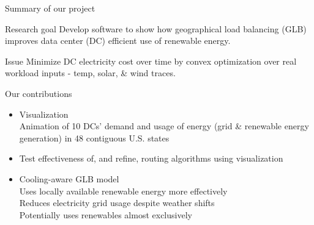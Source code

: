 \documentclass[xcolor=dvipsnames]{beamer}
\begin{document}
\begin{frame}{Summary of our project}

	\begin{block}{Research goal}  
	Develop software to show how geographical load balancing (GLB) improves data center (DC) efficient use of renewable energy.  
	\end{block}
	
	\begin{block}{Issue} 
	Minimize DC electricity cost over time by convex optimization over real workload inputs - temp, solar, \& wind traces.
	\end{block}

	\begin{block}{Our contributions} 
	\begin{itemize}
		\item{Visualization \\ 
		Animation of 10 DCs' demand and usage of energy (grid \& renewable energy generation) in 48 contiguous U.S. states}
		\item{Test effectiveness of, and refine, routing algorithms using visualization}
		\item{Cooling-aware GLB model \\
			Uses locally available renewable energy more effectively \\
			Reduces electricity grid usage despite weather shifts\\
			Potentially uses renewables almost exclusively}
	\end{itemize} 
	\end{block}

\end{frame}
%
%
\end{document}
